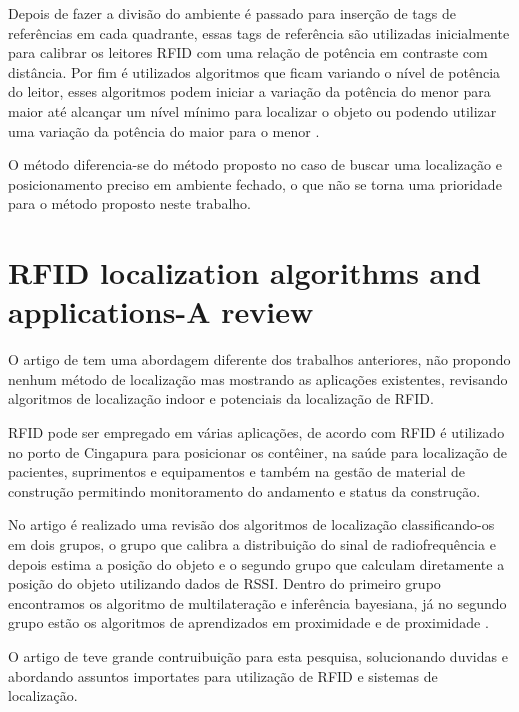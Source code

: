 \par
Depois de fazer a divisão do ambiente é passado para inserção de tags de referências em cada quadrante, essas tags de referência são utilizadas inicialmente para calibrar os leitores RFID com uma relação de potência em contraste com distância. Por fim é utilizados algoritmos que ficam variando o nível de potência do leitor, esses algoritmos podem iniciar a variação da potência do menor para maior até alcançar um nível mínimo para localizar o objeto ou podendo utilizar uma variação da potência do maior para o menor \cite{localization2010}.

\par
O método  diferencia-se do método proposto no caso de buscar uma localização e posicionamento preciso em ambiente fechado, o que não se torna uma prioridade para o método proposto neste trabalho.


\section{RFID localization algorithms and applications-A review}
O artigo de  tem uma abordagem diferente dos trabalhos anteriores, não propondo nenhum método de localização mas mostrando as aplicações existentes, revisando algoritmos de localização indoor e potenciais da localização de RFID.
\par
RFID pode ser empregado em várias aplicações, de acordo com  RFID é utilizado no porto de Cingapura para posicionar os contêiner, na saúde para localização de pacientes, suprimentos e equipamentos  e também na gestão de material de construção permitindo monitoramento do andamento e status da construção.
\par
No artigo é realizado uma revisão dos algoritmos de localização classificando-os em dois grupos, o grupo que calibra a distribuição do sinal de radiofrequência e depois estima a posição do objeto e o segundo grupo que calculam diretamente a posição do objeto utilizando dados de RSSI. Dentro do primeiro grupo encontramos os algoritmo de multilateração e inferência bayesiana, já no segundo grupo estão os algoritmos de aprendizados em proximidade e de proximidade \cite{rfid2009review}.
\par
O artigo de  teve grande contruibuição para esta pesquisa, solucionando duvidas e abordando assuntos importates para utilização de RFID e sistemas de localização.
